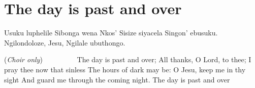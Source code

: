 \starttocol
\chapter{The day is past and over}
\nexttocol
\hfill{\it }
\stoptocol
\starttocol
\startlines
{\sc Usuku} luphelile
Sibonga wena Nkos'
Sisize siyacela
Singon' ebusuku.
Ngilondoloze, Jesu,
Ngilale ubuthongo.

          \hfill({\it Choir only})~~~~~~~~~
The day is past and over;
All thanks, O Lord, to thee;
I pray thee now that sinless
The hours of dark may be:
O Jesu, keep me in thy sight
And guard me through the coming night.
\stoplines
\nexttocol
The day is past and over
\stoptocol
